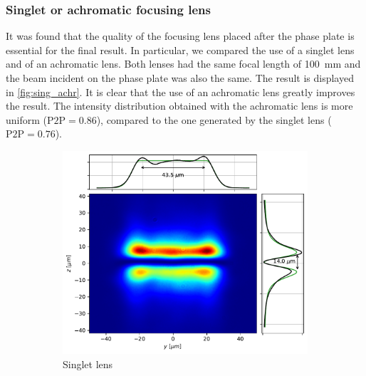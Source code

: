 \subsubsection{Singlet or achromatic focusing lens}
It was found that the quality of the focusing lens placed after the phase plate is essential for the final result. In particular, we compared the use of a singlet lens and of an achromatic lens. Both lenses had the same focal length of \SI{100}{mm} and the beam incident on the phase plate was also the same. The result is displayed in \cref{fig:sing_achr}. It is clear that the use of an achromatic lens greatly improves the result. The intensity distribution obtained with the achromatic lens is more uniform ($\text{P2P} = 0.86$), compared to the one generated by the singlet lens ($\text{P2P} =0.76$).
\begin{figure}
    \centering
    \begin{subfigure}{0.45\textwidth}
        \includegraphics[width=\textwidth]{chapters/chapter_3/figures/sing.pdf}
        \caption{Singlet lens}
        \label{fig:singlet}
    \end{subfigure}
    \hfill
    \begin{subfigure}{0.45\textwidth}

\end{subfigure}
\end{figure}
